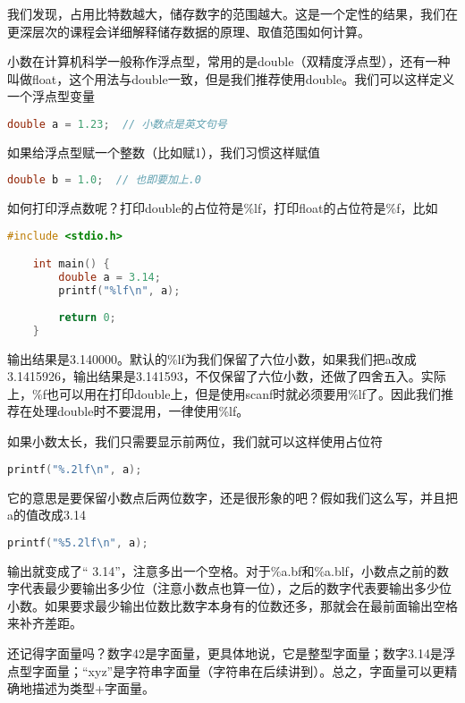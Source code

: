 我们发现，占用比特数越大，储存数字的范围越大。这是一个定性的结果，我们在更深层次的课程会详细解释储存数据的原理、取值范围如何计算。

小数在计算机科学一般称作浮点型，常用的是double（双精度浮点型），还有一种叫做float，这个用法与double一致，但是我们推荐使用double。我们可以这样定义一个浮点型变量

\begin{lstlisting}[language=C]
    double a = 1.23;  // 小数点是英文句号
\end{lstlisting}

如果给浮点型赋一个整数（比如赋1），我们习惯这样赋值

\begin{lstlisting}[language=C]
    double b = 1.0;  // 也即要加上.0
\end{lstlisting}

如何打印浮点数呢？打印double的占位符是\%lf，打印float的占位符是\%f，比如

\begin{lstlisting}[language=C]
    #include <stdio.h>

    int main() {
        double a = 3.14;
        printf("%lf\n", a);
        
        return 0;
    }
\end{lstlisting}

输出结果是3.140000。默认的\%lf为我们保留了六位小数，如果我们把a改成3.1415926，输出结果是3.141593，不仅保留了六位小数，还做了四舍五入。实际上，\%f也可以用在打印double上，但是使用scanf时就必须要用\%lf了。因此我们推荐在处理double时不要混用，一律使用\%lf。

如果小数太长，我们只需要显示前两位，我们就可以这样使用占位符

\begin{lstlisting}[language=C]
    printf("%.2lf\n", a);
\end{lstlisting}

它的意思是要保留小数点后两位数字，还是很形象的吧？假如我们这么写，并且把a的值改成3.14

\begin{lstlisting}[language=C]
    printf("%5.2lf\n", a);
\end{lstlisting}

输出就变成了“ 3.14”，注意多出一个空格。对于\%a.bf和\%a.blf，小数点之前的数字代表最少要输出多少位（注意小数点也算一位），之后的数字代表要输出多少位小数。如果要求最少输出位数比数字本身有的位数还多，那就会在最前面输出空格来补齐差距。

还记得字面量吗？数字42是字面量，更具体地说，它是整型字面量；数字3.14是浮点型字面量；“xyz”是字符串字面量（字符串在后续讲到）。总之，字面量可以更精确地描述为类型+字面量。

